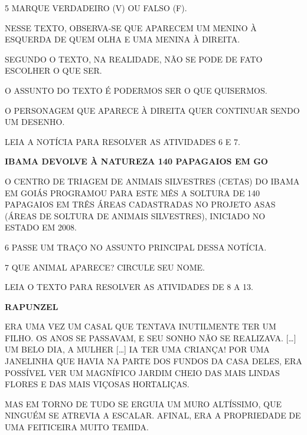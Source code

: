 \num{5} MARQUE VERDADEIRO (V) OU FALSO (F).

\begin{boxlist}
 NESSE TEXTO, OBSERVA-SE QUE APARECEM UM MENINO À ESQUERDA DE QUEM OLHA E UMA MENINA À DIREITA.

 SEGUNDO O TEXTO, NA REALIDADE, NÃO SE PODE DE FATO ESCOLHER O QUE SER.

 O ASSUNTO DO TEXTO É PODERMOS SER O QUE QUISERMOS.

 O PERSONAGEM QUE APARECE À DIREITA QUER CONTINUAR SENDO UM DESENHO.
\end{boxlist}

LEIA A NOTÍCIA PARA RESOLVER AS ATIVIDADES 6 E 7.

\begin{myquote}
\textbf{IBAMA DEVOLVE À NATUREZA 140 PAPAGAIOS EM GO}

O CENTRO DE TRIAGEM DE ANIMAIS SILVESTRES
(CETAS) DO IBAMA EM GOIÁS PROGRAMOU PARA ESTE MÊS A SOLTURA DE 140
PAPAGAIOS EM TRÊS ÁREAS CADASTRADAS NO PROJETO ASAS (ÁREAS DE SOLTURA
DE ANIMAIS SILVESTRES), INICIADO NO ESTADO EM 2008.~

\end{myquote}

\num{6} PASSE UM TRAÇO NO ASSUNTO PRINCIPAL DESSA NOTÍCIA.

\vspace{0.5cm}

\num{7} QUE ANIMAL APARECE? CIRCULE SEU NOME. 

\vspace{0.5cm}

LEIA O TEXTO PARA RESOLVER AS ATIVIDADES DE 8 A 13.\enlargethispage{2\baselineskip}

\begin{myquote}
\textbf{RAPUNZEL}

ERA UMA VEZ UM CASAL QUE TENTAVA INUTILMENTE TER UM
FILHO. OS ANOS SE PASSAVAM, E SEU SONHO NÃO SE REALIZAVA. [\ldots{}] UM
BELO DIA, A MULHER [\ldots{}] IA TER UMA
CRIANÇA! POR UMA JANELINHA QUE HAVIA NA PARTE DOS FUNDOS DA CASA DELES,
ERA POSSÍVEL VER UM MAGNÍFICO JARDIM CHEIO DAS MAIS
LINDAS FLORES E DAS MAIS VIÇOSAS HORTALIÇAS.

MAS EM TORNO DE TUDO SE ERGUIA UM MURO ALTÍSSIMO, QUE NINGUÉM SE ATREVIA
A ESCALAR. AFINAL, ERA A PROPRIEDADE DE UMA FEITICEIRA MUITO TEMIDA.

\end{myquote}\pagebreak

